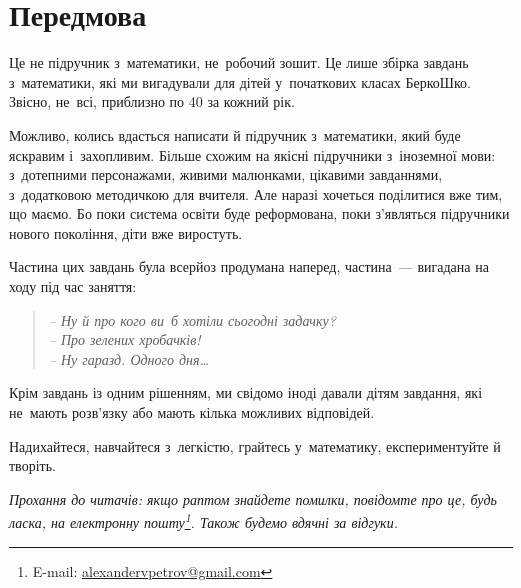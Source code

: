 \chapter*{Передмова}

Це не підручник з~математики, не~робочий зошит.
Це лише збірка завдань з~математики, які ми вигадували для дітей
у~початкових класах БеркоШко.
Звісно, не~всі, приблизно по 40 за кожний рік.

Можливо, колись вдасться написати й підручник з~математики,
який буде яскравим і~захопливим.
Більше схожим на якісні підручники з~іноземної мови: з~дотепними персонажами,
живими малюнками, цікавими завданнями, з~додатковою методичкою для вчителя.
Але наразі хочеться поділитися вже тим, що маємо.
Бо поки система освіти буде реформована, поки з’являться підручники
нового покоління, діти вже виростуть.

Частина цих завдань була всерйоз продумана наперед,
частина~--- вигадана на ходу під час заняття:
\begin{quote}
  \itshape
  -- Ну й про кого ви~б хотіли сьогодні задачку? \\
  -- Про зелених хробачків! \\
  -- Ну гаразд. Одного дня\ldots
  \end{quote}

Крім завдань із одним рішенням, ми свідомо іноді давали дітям завдання,
які не~мають розв’язку або мають кілька можливих відповідей.

Надихайтеся, навчайтеся з~легкістю, грайтесь у~математику,
експериментуйте й творіть. \smiley

\medskip

\emph{%
Прохання до читачів: якщо раптом знайдете помилки,
повідомте про це, будь ласка, на електронну пошту\footnote{
  E-mail: \href{mailto:alexandervpetrov@gmail.com}{alexandervpetrov@gmail.com}
}. Також будемо вдячні за відгуки.}
